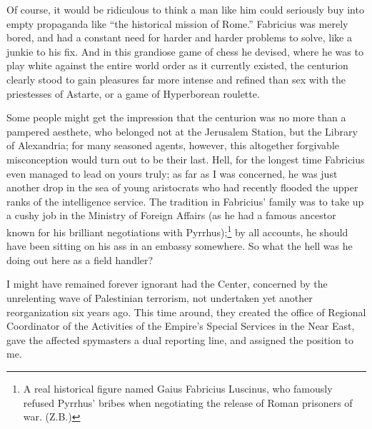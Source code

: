 Of course, it would be ridiculous to think a man like him could seriously buy into empty propaganda like ``the historical mission of Rome.'' Fabricius was merely bored, and had a constant need for harder and harder problems to solve, like a junkie to his fix. And in this grandiose game of chess he devised, where he was to play white against the entire world order as it currently existed, the centurion clearly stood to gain pleasures far more intense and refined than sex with the priestesses of Astarte, or a game of Hyperborean roulette.

Some people might get the impression that the centurion was no more than a pampered aesthete, who belonged not at the Jerusalem Station, but the Library of Alexandria; for many seasoned agents, however, this altogether forgivable misconception would turn out to be their last. Hell, for the longest time Fabricius even managed to lead on yours truly; as far as I was concerned, he was just another drop in the sea of young aristocrats who had recently flooded the upper ranks of the intelligence service. The tradition in Fabricius' family was to take up a cushy job in the Ministry of Foreign Affairs (as he had a famous ancestor known for his brilliant negotiations with Pyrrhus);\footnote{A real historical figure named Gaius Fabricius Luscinus, who famously refused Pyrrhus' bribes when negotiating the release of Roman prisoners of war. (Z.B.)} by all accounts, he should have been sitting on his ass in an embassy somewhere. So what the hell was he doing out here as a field handler?

I might have remained forever ignorant had the Center, concerned by the unrelenting wave of Palestinian terrorism, not undertaken yet another reorganization six years ago. This time around, they created the office of Regional Coordinator of the Activities of the Empire's Special Services in the Near East, gave the affected spymasters a dual reporting line, and assigned the position to me.

